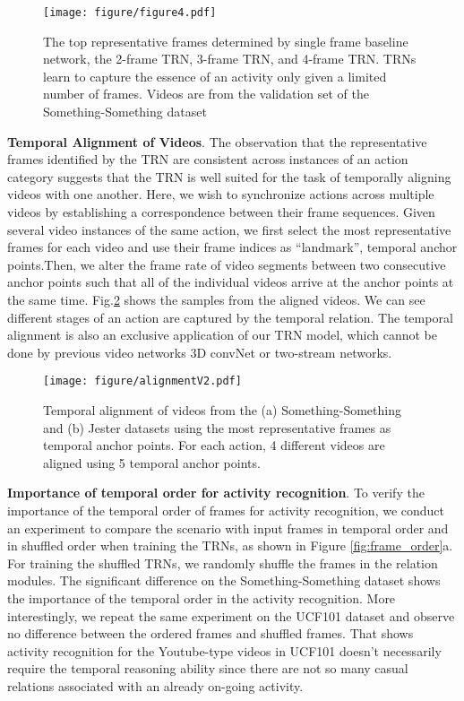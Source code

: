 \documentclass[runningheads]{llncs}
\begin{document}
\begin{figure}
\vspace{-6mm}
\centering
\texttt{[image: figure/figure4.pdf]}
\vspace{-7mm}
\caption{The top representative frames determined by single frame baseline network, the 2-frame TRN, 3-frame TRN, and 4-frame TRN. TRNs learn to capture the essence of an activity only given a limited number of frames. Videos are from the validation set of the Something-Something dataset}
\label{representative_frames}
\vspace{-4mm}
\end{figure}

\textbf{Temporal Alignment of Videos}. The observation that the representative frames identified by the TRN are consistent across instances of an action category suggests that the TRN is well suited for the task of temporally aligning videos with one another. Here, we wish to synchronize actions across multiple videos by establishing a correspondence between their frame sequences. Given several video instances of the same action, we first select the most representative frames for each video and use their frame indices as ``landmark'', temporal anchor points.Then, we alter the frame rate of video segments between two consecutive anchor points such that all of the individual videos arrive at the anchor points at the same time. Fig.\ref{video_alignment} shows the samples from the aligned videos. We can see different stages of an action are captured by the temporal relation. The temporal alignment is also an exclusive application of our TRN model, which cannot be done by previous video networks 3D convNet or two-stream networks.
\begin{figure}
\vspace{-10mm}
\centering
\texttt{[image: figure/alignmentV2.pdf]}
\vspace{-3mm}
\caption{Temporal alignment of videos  from the (a) Something-Something and (b) Jester  datasets using the most representative frames as temporal anchor points. For each action, 4 different videos are aligned using 5 temporal anchor points.}
\label{video_alignment}
\vspace{-6mm}
\end{figure}

\textbf{Importance of temporal order for activity recognition}. To verify the importance of the temporal order of frames for activity recognition, we conduct an experiment to compare the scenario with input frames in temporal order and in shuffled order when training the TRNs, as shown in Figure \ref{fig:frame_order}a. For training the shuffled TRNs, we randomly shuffle the frames in the relation modules. The significant difference on the Something-Something dataset shows the importance of the temporal order in the activity recognition. More interestingly, we repeat the same experiment on the UCF101 dataset \cite{soomro2012ucf101} and observe no difference between the ordered frames and shuffled frames. That shows activity recognition for the Youtube-type videos in UCF101 doesn't necessarily require the temporal reasoning ability since there are not so many casual relations associated with an already on-going activity.
\end{document}

